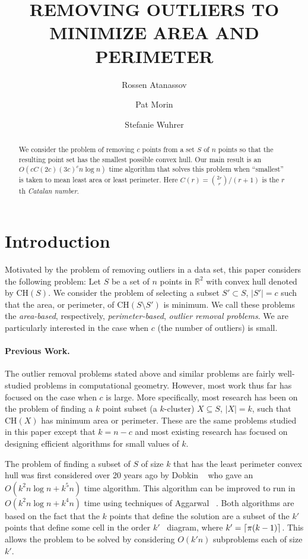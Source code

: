 \documentclass[lotsofwhite]{patmorin}
\title{\MakeUppercase{Removing Outliers to Minimize Area and Perimeter}}
\author{Rossen Atanassov \and
    Pat Morin \and
    Stefanie Wuhrer}
\date{}
\newcommand{\ch}{\mathrm{CH}}
\newcommand{\ntypes}{cC(2c)}
\newcommand{\timepertype}{(3c)^c n\log n}
\newcommand{\runtime}{\ntypes \timepertype}
\begin{document}
\maketitle

\begin{abstract}
We consider the problem of removing $c$ points from a set $S$ of $n$
points so that the resulting point set has the smallest possible
convex hull.  Our main result is an $O(\runtime)$ time algorithm
that solves this problem when ``smallest'' is taken to mean least area
or least perimeter. Here $C(r) = {2r\choose r}/(r+1)$ is
the $r$th \emph{Catalan number}.
\end{abstract}

\section{Introduction}

Motivated by the problem of removing outliers in a data set, this
paper considers the following problem: Let $S$ be a set of $n$ points
in $\mathbb{R}^2$ with convex hull denoted by $\ch(S)$.  We consider
the problem of selecting a subset $S'\subset S$, $|S'|=c$ such that
the area, or perimeter, of $\ch(S\setminus S')$ is minimum.  We call
these problems the \emph{area-based}, respectively,
\emph{perimeter-based}, \emph{outlier removal problems}.  We are
particularly interested in the case when $c$ (the number of outliers)
is small.

\paragraph{Previous Work.} 

The outlier removal problems stated above and similar problems are
fairly well-studied problems in computational geometry.  However, most
work thus far has focused on the case when $c$ is large. More
specifically, most research has been on the problem of finding a $k$
point subset (a $k$-cluster) $X\subseteq S$, $|X|=k$, such that
$\ch(X)$ has minimum area or perimeter. These are the same problems
studied in this paper except that $k=n-c$ and most existing research
has focused on designing efficient algorithms for small values of $k$.

The problem of finding a subset of $S$ of size $k$ that has the least
perimeter convex hull was first considered over 20 years ago by Dobkin
\etal\ \cite{ddg83} who gave an $O(k^2n\log n + k^5 n)$ time
algorithm.  This algorithm can be improved to run in $O(k^2 n\log n +
k^4 n)$ time using techniques of Aggarwal \etal\ \cite{aiks89}.  Both
algorithms are based on the fact that the $k$ points that define the
solution are a subset of the $k'$ points that define some cell in the
order $k'$ \voronoi\ diagram, where $k'=\left\lceil \pi (k-1) \right\rceil$.  This
allows the problem to be solved by considering $O(k'n)$ subproblems
each of size $k'$.
\end{document}
